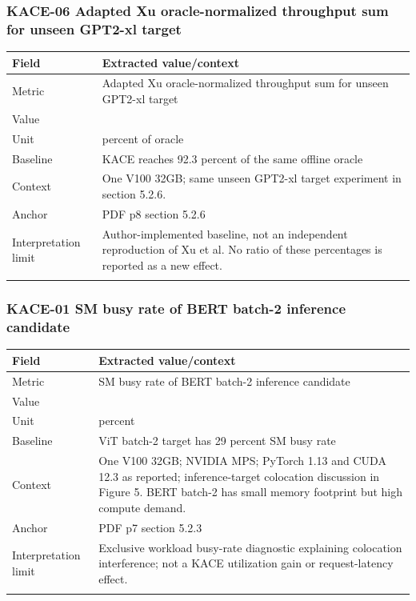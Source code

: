 \subsubsection*{KACE-06 Adapted Xu oracle-normalized throughput sum for unseen GPT2-xl target}
\begin{longtable}{>{\raggedright\arraybackslash}p{}>{\raggedright\arraybackslash}p{}}
\toprule
\textbf{Field} & \textbf{Extracted value/context}\\\midrule\endhead
Metric & Adapted Xu oracle-normalized throughput sum for unseen GPT2-xl target\\\addlinespace
Value & 57.8\\\addlinespace
Unit & percent of oracle\\\addlinespace
Baseline & KACE reaches 92.3 percent of the same offline oracle\\\addlinespace
Context & One V100 32GB;\allowbreak{} same unseen GPT2-xl target experiment in section 5.2.6.\\\addlinespace
Anchor & PDF p8 section 5.2.6\\\addlinespace
Interpretation limit & Author-implemented baseline,\allowbreak{} not an independent reproduction of Xu et al. No ratio of these percentages is reported as a new effect.\\\addlinespace
\bottomrule\end{longtable}
\subsubsection*{KACE-01 SM busy rate of BERT batch-2 inference candidate}
\begin{longtable}{>{\raggedright\arraybackslash}p{}>{\raggedright\arraybackslash}p{}}
\toprule
\textbf{Field} & \textbf{Extracted value/context}\\\midrule\endhead
Metric & SM busy rate of BERT batch-2 inference candidate\\\addlinespace
Value & 92\\\addlinespace
Unit & percent\\\addlinespace
Baseline & ViT batch-2 target has 29 percent SM busy rate\\\addlinespace
Context & One V100 32GB;\allowbreak{} NVIDIA MPS;\allowbreak{} PyTorch 1.13 and CUDA 12.3 as reported;\allowbreak{} inference-target colocation discussion in Figure 5. BERT batch-2 has small memory footprint but high compute demand.\\\addlinespace
Anchor & PDF p7 section 5.2.3\\\addlinespace
Interpretation limit & Exclusive workload busy-rate diagnostic explaining colocation interference;\allowbreak{} not a KACE utilization gain or request-latency effect.\\\addlinespace
\bottomrule\end{longtable}
